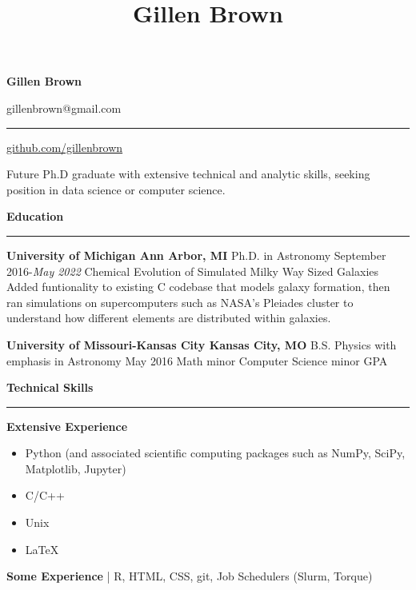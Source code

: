 \documentclass[10pt]{article}
\title{Gillen Brown}
\newcommand{\header}[1]{\vspace{1.5em}\par \textbf{\large #1}\strut\hrule\vspace{0em}}
\newcommand{\actionHeader}[2]{\textbf{#1 \hfill #2}}
\newcommand{\indentedItemDate}[2]{\newline\null\qquad #1 \hfill #2}
\newcommand{\indentedItem}[1]{\newline\null\qquad #1}
\begin{document}
\thispagestyle{empty}


\begin{center}
{\huge \bf Gillen Brown}

{\Large gillenbrown@gmail.com \enspace \rule[-5pt]{1pt}{20pt} \enspace \href{http://www.github.com/gillenbrown}{github.com/gillenbrown}}

\bigskip

\parbox[c][2em][s]{0.8\textwidth}{\center \large Future Ph.D graduate with extensive technical and analytic skills, seeking position in data science or computer science.}

\medskip

\end{center}

\header{Education}
\actionHeader{University of Michigan}{Ann Arbor, MI}
\indentedItemDate{Ph.D. in Astronomy}{September 2016-{\it May 2022}}
\indentedItem{{\bf Topic:} Chemical Evolution of Simulated Milky Way Sized Galaxies}
\indentedItem{{\bf Summary:} Added funtionality to existing C codebase that models galaxy formation, then ran }
\indentedItem{simulations on supercomputers such as NASA's Pleiades cluster to understand how different elements}
\indentedItem{are distributed within galaxies.}

\actionHeader{University of Missouri-Kansas City}{Kansas City, MO}
\indentedItemDate{B.S. Physics with emphasis in Astronomy}{May 2016}
\indentedItem{Math minor}
\indentedItem{Computer Science minor}
\indentedItem{4.0 GPA}

\header{Technical Skills}
\actionHeader{Extensive Experience}{}
\vspace{-0.6em}
\begin{itemize}
    \item Python (and associated scientific computing packages such as NumPy, SciPy, Matplotlib, Jupyter)
    \item C/C++
    \item Unix
    \item LaTeX
\end{itemize}

{\bf Some Experience} | R, HTML, CSS, git, Job Schedulers (Slurm, Torque)
\end{document}

